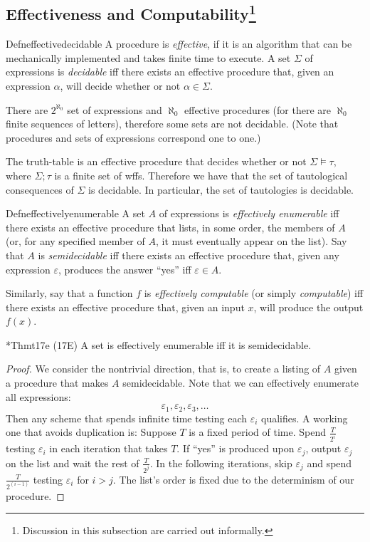 \subsection*{Effectiveness and Computability\footnote{Discussion in this subsection are carried out informally.}}

\begin{reference}{Defn}{effectivedecidable}
  A procedure is \textit{effective}, if it is an algorithm that can be mechanically implemented and takes finite time to execute. A set $\Sigma$ of expressions is \textit{decidable} iff there exists an effective procedure that, given an expression $\alpha$, will decide whether or not $\alpha\in \Sigma$.
\end{reference}

There are $2^{\aleph_0}$ set of expressions and $\aleph_0$ effective procedures (for there are $\aleph_0$ finite sequences of letters), therefore some sets are not decidable. (Note that procedures and sets of expressions correspond one to one.)

The truth-table is an effective procedure that decides whether or not $\Sigma\vDash \tau$, where $\Sigma;\tau$ is a finite set of wffs. Therefore we have that the set of tautological consequences of $\Sigma$ is decidable. In particular, the set of tautologies is decidable.

\begin{reference}{Defn}{effectivelyenumerable}
  A set $A$ of expressions is \textit{effectively enumerable} iff there exists an effective procedure that lists, in some order, the members of $A$ (or, for any specified member of $A$, it must eventually appear on the list). Say that $A$ is \textit{semidecidable} iff there exists an effective procedure that, given any expression $\varepsilon$, produces the answer ``yes'' iff $\varepsilon\in A$.
\end{reference}

Similarly, say that a function $f$ is \textit{effectively computable} (or simply \textit{computable}) iff there exists an effective procedure that, given an input $x$, will produce the output $f(x)$.

\begin{reference}{*Thm}{t17e}
  (17E) A set is effectively enumerable iff it is semidecidable.
\end{reference}

\begin{proof}
  We consider the nontrivial direction, that is, to create a listing of $A$ given a procedure that makes $A$ semidecidable. Note that we can effectively enumerate all expressions:
  \[
    \varepsilon_1,\varepsilon_2,\varepsilon_3,\dots
  \]
  Then any scheme that spends infinite time testing each $\varepsilon_i$ qualifies. A working one that avoids duplication is:
  Suppose $T$ is a fixed period of time. Spend $\frac{T}{2^i}$ testing $\varepsilon_i$ in each iteration that takes $T$. If ``yes'' is produced upon $\varepsilon_j$, output $\varepsilon_j$ on the list and wait the rest of $\frac{T}{2^j}$. In the following iterations, skip $\varepsilon_j$ and spend $\frac{T}{2^{(i-1)}}$ testing $\varepsilon_i$ for $i>j$. The list's order is fixed due to the determinism of our procedure.
\end{proof}

